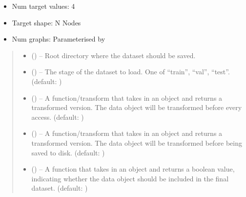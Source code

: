 \documentclass[letterpaper,10pt,english]{sphinxhowto}
\begin{document}
\begin{fulllineitems}
\begin{itemize}
\item {} 
\sphinxAtStartPar
Num target values: 4

\item {} 
\sphinxAtStartPar
Target shape: N Nodes

\item {} 
\sphinxAtStartPar
Num graphs: Parameterised by 

\end{itemize}
\begin{quote}\begin{description}
\begin{itemize}
\item {} 
\sphinxAtStartPar
{} () – Root directory where the dataset should be saved.

\item {} 
\sphinxAtStartPar
{} () – The stage of the dataset to load. One of “train”, “val”, “test”. (default: )

\item {} 
\sphinxAtStartPar
{} (\sphinxstyleliteralemphasis{\sphinxupquote{, }}) – A function/transform that takes in an  object and returns a transformed version. The data object will be transformed before every access. (default: )

\item {} 
\sphinxAtStartPar
{} (\sphinxstyleliteralemphasis{\sphinxupquote{, }}) – A function/transform that takes in an  object and returns a transformed version. The data object will be transformed before being saved to disk. (default: )

\item {} 
\sphinxAtStartPar
{} (\sphinxstyleliteralemphasis{\sphinxupquote{, }}) – A function that takes in an  object and returns a boolean value, indicating whether the data object should be included in the final dataset. (default: )


\end{itemize}
\end{description}
\end{quote}
\end{fulllineitems}
\end{document}
